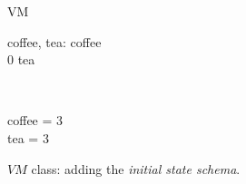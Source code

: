 \begin{figure}[H]
\centering
\begin{class}{VM}
\begin{state}
coffee, tea: \integer
{} \leq  coffee 
\\
0 \leq  tea 
\end{state} 
\\
\begin{init}
coffee = 3
\\tea = 3
\end{init} 
\end{class}
\caption{$VM$ class: adding the \textit{initial state schema}.}
\label{oz_vm_init_schema}
\end{figure}